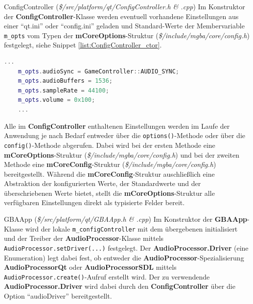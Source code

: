 \documentclass[11pt,a4paper]{scrartcl}
\begin{document}
\vspace{5mm}
\large ConfigController \normalsize(\textit{\$/src/platform/qt/ConfigController.h \& .cpp})
\vspace{2mm}\newline
Im Konstruktor der \textbf{ConfigController}-Klasse werden eventuell vorhandene Einstellungen aus einer \enquote{qt.ini} oder \enquote{config.ini} geladen und Standard-Werte der Membervariable \verb|m_opts| vom Typen der \textbf{mCoreOptions}-Struktur (\textit{\$/include/mgba/core/config.h}) festgelegt, siehe Snippet \ref{list:ConfigController_ctor}.

\vspace{5mm}
\begin{lstlisting}[language=C++, caption={Ausschnitt aus dem Konstruktor der ConfigController-Klasse}, label={list:ConfigController_ctor}]
    ...
	m_opts.audioSync = GameController::AUDIO_SYNC;
	m_opts.audioBuffers = 1536;
	m_opts.sampleRate = 44100;
	m_opts.volume = 0x100;
	...
\end{lstlisting}

Alle im \textbf{ConfigController} enthaltenen Einstellungen werden im Laufe der Anwendung je nach Bedarf entweder \"uber die \verb|options()|-Methode oder \"uber die \verb|config()|-Methode abgerufen. Dabei wird bei der ersten Methode eine \textbf{mCoreOptions}-Struktur (\textit{\$/include/mgba/core/config.h}) und bei der zweiten Methode eine \textbf{mCoreConfig}-Struktur (\textit{\$/include/mgba/core/config.h}) bereitgestellt. W\"ahrend die \textbf{mCoreConfig}-Struktur auschlie{\ss}lich eine Abstraktion der konfigurierten Werte, der Standardwerte und der \"uberschriebenen Werte bietet, stellt die \textbf{mCoreOptions}-Struktur alle verf\"ugbaren Einstellungen direkt als typisierte Felder bereit.

\vspace{5mm}
\large GBAApp \normalsize(\textit{\$/src/platform/qt/GBAApp.h \& .cpp})
\vspace{2mm}\newline
Im Konstruktor der \textbf{GBAApp}-Klasse wird der lokale \verb|m_configController| mit dem \"ubergebenen initialisiert und der Treiber der \textbf{AudioProcessor}-Klasse mittels \verb|AudioProcessor.setDriver(...)| festgelegt. Der \textbf{AudioProcessor.Driver} (eine Enumeration) legt dabei fest, ob entweder die \textbf{AudioProcessor}-Spezialisierung \textbf{AudioProcessorQt} oder \textbf{AudioProcessorSDL} mittels \verb|AudioProcessor.create()|-Aufruf erstellt wird. Der zu verwendende \textbf{AudioProcessor.Driver} wird dabei durch den \textbf{ConfigController} \"uber die Option \enquote{audioDriver} bereitgestellt.
\end{document}
